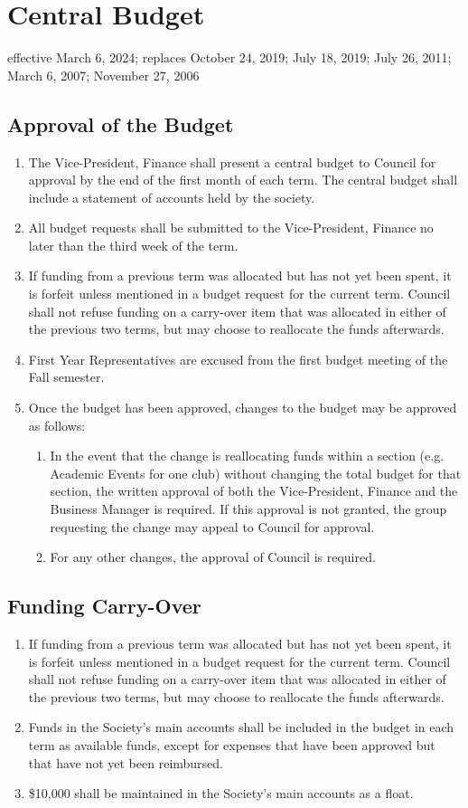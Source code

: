 \section{Central Budget}
effective March 6, 2024; replaces October 24, 2019; July 18, 2019; July 26, 2011; March 6, 2007; November 27, 2006

\subsection{Approval of the Budget}
\begin{enumerate}
\item The Vice-President, Finance shall present a central budget to Council for approval by the end of the first month of each term. The central budget shall include a statement of accounts held by the society.
\item All budget requests shall be submitted to the Vice-President, Finance no later than the third week of the term.
\item If funding from a previous term was allocated but has not yet been spent, it is forfeit unless mentioned in a budget request for the current term. Council shall not refuse funding on a carry-over item that was allocated in either of the previous two terms, but may choose to reallocate the funds afterwards.
\item First Year Representatives are excused from the first budget meeting of the Fall semester.
\item Once the budget has been approved, changes to the budget may be approved as follows:
\begin{enumerate}
\item In the event that the change is reallocating funds within a section (e.g. Academic Events for one club) without changing the total budget for that section, the written approval of both the Vice-President, Finance and the Business Manager is required. If this approval is not granted, the group requesting the change may appeal to Council for approval.
\item For any other changes, the approval of Council is required.
\end{enumerate}
\end{enumerate}


\subsection{Funding Carry-Over}
\begin{enumerate}
\item If funding from a previous term was allocated but has not yet been spent, it is forfeit unless mentioned in a budget request for the current term. Council shall not refuse funding on a carry-over item that was allocated in either of the previous two terms, but may choose to reallocate the funds afterwards.
\item Funds in the Society's main accounts shall be included in the budget in each term as available funds, except for expenses that have been approved but that have not yet been reimbursed.
\item \$10,000 shall be maintained in the Society's main accounts as a float.
\end{enumerate}


